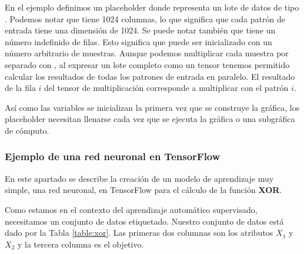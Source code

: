 \begin{sphinxVerbatim}[commandchars=\\\{\}]
    \PYG{p}{[} \PYG{p}{]}
  \PYG{p}{[}\PYG{p}{]}   
   
\end{sphinxVerbatim}

En el ejemplo definimos un placeholder donde 
representa un lote de datos de tipo .
Podemos notar que  tiene 1024 columnas, lo
que significa que cada patrón de entrada
tiene una dimensión de 1024. Se puede notar también
que  tiene un número indefinido de filas.
Esto significa que  puede ser inicializado
con un número arbitrario de muestras. Aunque podemos
multiplicar cada muestra por separado con ,
al expresar un lote completo como un tensor tenemos
permitido calcular los resultados de todas los
patrones de entrada en paralelo. El
resultado de la fila $i$ del tensor de
multiplicación corresponde a multiplicar 
con el patrón $i$.

Así como las variables se inicializan la primera vez
que se construye la gráfica, los placeholder necesitan
llenarse cada vez que se ejecuta la gráfica o una
subgráfica de cómputo.


\subsubsection{Ejemplo de una red neuronal en TensorFlow}

En este apartado se describe la creación de un modelo de aprendizaje muy
simple, una red neuronal, en TensorFlow para el cálculo de la función
\textbf{XOR}.


Como estamos en el contexto del aprendizaje automático
supervisado, necesitamos un conjunto de datos etiquetado.
Nuestro conjunto de datos está dado por la Tabla \ref{table:xor}. Las
primeras dos columnas son los atributos $X_1$ y $X_2$ y la tercera 
columna es el objetivo.


